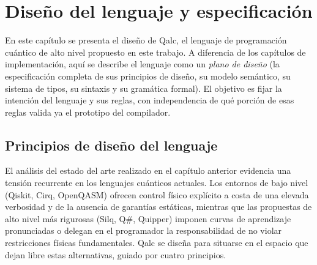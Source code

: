 \chapter{Diseño del lenguaje y especificación}
\label{ch:diseno}

En este capítulo se presenta el diseño de Qalc, el lenguaje de programación cuántico de alto nivel propuesto en este trabajo. A diferencia de los capítulos de implementación, aquí se describe el lenguaje como un \textit{plano de diseño} (la especificación completa de sus principios de diseño, su modelo semántico, su sistema de tipos, su sintaxis y su gramática formal). El objetivo es fijar la intención del lenguaje y sus reglas, con independencia de qué porción de esas reglas valida ya el prototipo del compilador.

\section{Principios de diseño del lenguaje}

El análisis del estado del arte realizado en el capítulo anterior evidencia una tensión recurrente en los lenguajes cuánticos actuales. Los entornos de bajo nivel (Qiskit, Cirq, OpenQASM) ofrecen control físico explícito a costa de una elevada verbosidad y de la ausencia de garantías estáticas, mientras que las propuestas de alto nivel más rigurosas (Silq, Q\#, Quipper) imponen curvas de aprendizaje pronunciadas o delegan en el programador la responsabilidad de no violar restricciones físicas fundamentales. Qalc se diseña para situarse en el espacio que dejan libre estas alternativas, guiado por cuatro principios.

